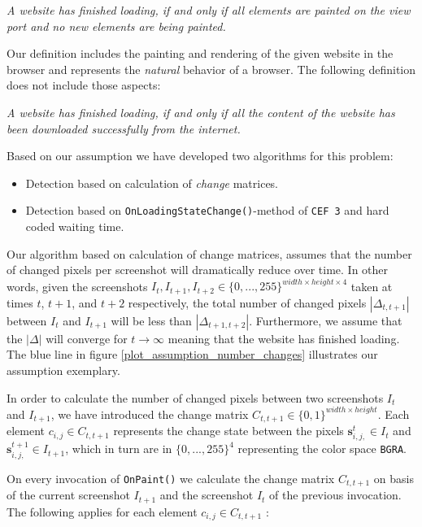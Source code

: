 \begin{center}
\textit{A website has finished loading, if and only if all elements are painted on the view port and no new elements are being painted.}
\end{center}

Our definition includes the painting and rendering of the given website in the browser and represents the \textit{natural} behavior of a browser. The following definition does not include those aspects:

\begin{center}
\textit{A website has finished loading, if and only if all the content of the website has been downloaded successfully from the internet.}
\end{center}

Based on our assumption we have developed two algorithms for this problem:

\begin{itemize}
	\item Detection based on calculation of \textit{change} matrices. 
	\item Detection based on \texttt{OnLoadingStateChange()}-method of \texttt{CEF 3} and hard coded waiting time.
\end{itemize}

Our algorithm based on calculation of change matrices, assumes that the number of changed pixels per screenshot will dramatically reduce over time. In other words, given the screenshots $I_{t}, I_{t+1}, I_{t+2}\in \{0, ... , 255\}^{width\times height \times 4}$ taken at times $t$, $t+1$,  and $t+2$ respectively, the total number of changed pixels  $|\Delta_{t,t+1}|$ between $I_{t}$ and $I_{t+1}$ will be less than $|\Delta_{t+1,t+2}|$. Furthermore, we assume that the $|\Delta|$ will converge for $t \rightarrow \infty$ meaning that the website has finished loading. The blue line in figure \ref{plot_assumption_number_changes} illustrates our assumption exemplary.

In order to calculate the number of changed pixels between two screenshots $I_{t}$ and $I_{t+1}$, we have introduced the change matrix $C_{t,t+1} \in \{0,1\}^{width\times height}$. Each element $c_{i,j} \in C_{t,t+1}$ represents the change state between the pixels $\mathbf{s}^{t}_{i,j,} \in I_{t}$ and $\mathbf{s}^{t+1}_{i,j,}  \in I_{t+1}$, which in turn are in $\{0, ... , 255\}^{4}$ representing the color space \texttt{BGRA}.

On every invocation of \texttt{OnPaint()} we calculate the change matrix $C_{t,t+1}$ on basis of the current screenshot $I_{t+1}$ and the screenshot $I_{t}$ of the previous invocation. The following applies for each element $c_{i,j} \in C_{t,t+1}$ :

